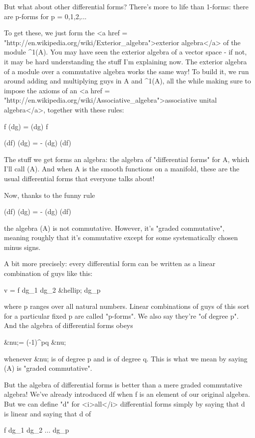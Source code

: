 But what about other differential forms?  There's more to life than
1-forms: there are p-forms for p = 0,1,2,...  

To get these, we just form the <a href =
"http://en.wikipedia.org/wiki/Exterior_algebra">exterior algebra</a>
of the module \Omega ^{1}(A).  You may have seen the exterior
algebra of a vector space - if not, it may be hard understanding the
stuff I'm explaining now.  The exterior algebra of a module over a
commutative algebra works the same way!  To build it, we run around
adding and multiplying guys in A and \Omega ^{1}(A), all the
while making sure to impose the axioms of an <a href =
"http://en.wikipedia.org/wiki/Associative_algebra">associative unital
algebra</a>, together with these rules:

f (dg) = (dg) f

(df) (dg) = - (dg) (df)

The stuff we get forms an algebra: the algebra of "differential forms"
for A, which I'll call \Omega (A).  And when A is the smooth functions
on a manifold, these are the usual differential forms that everyone
talks about!

Now, thanks to the funny rule 

(df) (dg) = - (dg) (df)

the algebra \Omega (A) is not commutative.  However, it's "graded
commutative", meaning roughly that it's commutative except for some
systematically chosen minus signs.

A bit more precisely: every differential form can be written as a
linear combination of guys like this:

v = f dg_{1} dg_{2} &hellip; dg_{p}

where p ranges over all natural numbers.  Linear combinations of guys
of this sort for a particular fixed p are called "p-forms".
We also say they're "of degree p".  And the algebra of
differential forms obeys

&nu;\omega  = (-1)^{pq} \omega &nu;

whenever &nu; is of degree p and \omega  is of degree q.  This is what we
mean by saying \Omega (A) is "graded commutative".

But the algebra of differential forms is better than a mere graded
commutative algebra!  We've already introduced df when f is an element
of our original algebra.  But we can define "d" for <i>all</i>
differential forms simply by saying that d is linear and saying that d
of

f dg_{1} dg_{2} ... dg_{p}

